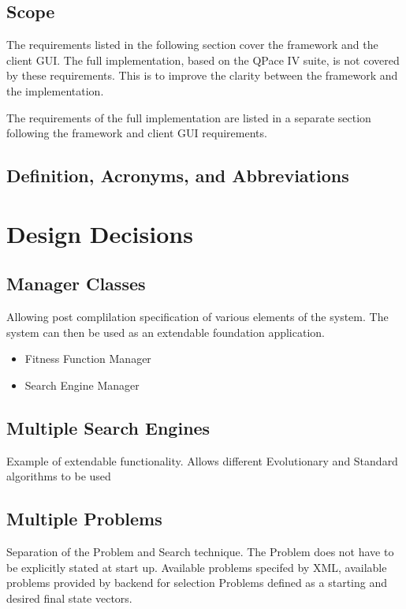 \documentclass[authoryearcitations]{UoYCSproject}
\begin{document}
\section{Scope}
The requirements listed in the following section cover the framework and the client GUI.
The full implementation, based on the QPace IV suite, is not covered by these requirements.
This is to improve the clarity between the framework and the implementation.

The requirements of the full implementation are listed in a separate section following the framework and client GUI requirements.

\section{Definition, Acronyms, and Abbreviations}



\chapter{Design Decisions}

\section{Manager Classes}
Allowing post complilation specification of various elements of the system.
The system can then be used as an extendable foundation application.

\begin{itemize}
 \item Fitness Function Manager
 \item Search Engine Manager
\end{itemize}


\section{Multiple Search Engines}
Example of extendable functionality.
Allows different Evolutionary and Standard algorithms to be used

\section{Multiple Problems}
Separation of the Problem and Search technique.
The Problem does not have to be explicitly stated at start up.
Available problems specifed by XML, available problems provided by backend for selection
Problems defined as a starting and desired final state vectors.
\end{document}
